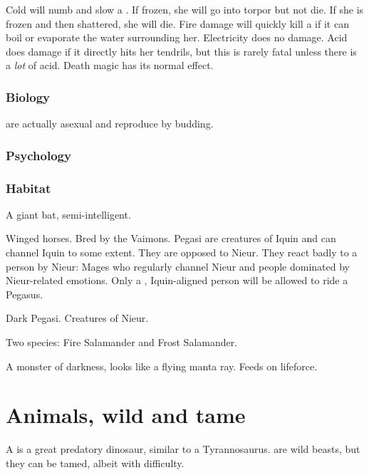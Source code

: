 Cold will numb and slow a \naiad{}. If frozen, she will go into torpor but not die. If she is frozen and then shattered, she will die. Fire damage will quickly kill a \naiad{} if it can boil or evaporate the water surrounding her. Electricity does no damage. Acid does damage if it directly hits her tendrils, but this is rarely fatal unless there is a \emph{lot} of acid. Death magic has its normal effect. 

\subsubsection{Biology}
\Naiads{} are actually asexual and reproduce by budding. 

\subsubsection{Psychology}
\subsubsection{Habitat}



A giant bat, semi-intelligent. 



Winged horses. Bred by the Vaimons. Pegasi are creatures of Iquin and can channel Iquin to some extent. They are opposed to Nieur. They react badly to a person  by Nieur: Mages who regularly channel Nieur and people dominated by Nieur-related emotions. Only a , Iquin-aligned person will be allowed to ride a Pegasus. 



Dark Pegasi. Creatures of Nieur. 



Two species: Fire Salamander and Frost Salamander. 



A monster of darkness, looks like a flying manta ray. Feeds on lifeforce. 





\newpage
\section{Animals, wild and tame}
\subsectionn{\Cortio{}}
\label{Cortio}
A \cortio{} is a great predatory dinosaur, similar to a Tyrannosaurus. \Cortios{} are wild beasts, but they can be tamed, albeit with difficulty. 


